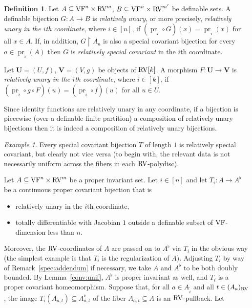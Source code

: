 \documentclass[12pt]{amsart}
\newcommand{\memph}[1]{{\color{magenta}\emph{#1}}}
\theoremstyle{plain}
\theoremstyle{definition}
\newtheorem{defn}[thm]{Definition}
\theoremstyle{remark}
\newtheorem{exam}[thm]{Example}
\numberwithin{equation}{section}
\theoremstyle{plain}
\newcommand{\VF}{\textup{VF}}
\newcommand{\RV}{\textup{RV}}
\DeclareMathOperator{\pr}{pr}
\newcommand{\0}{\emptyset}
\newcommand{\rest}{\upharpoonright}
\newcommand{\fun}{\longrightarrow}
\newcommand{\sub}{\subseteq}
\begin{document}
\begin{defn}\label{rela:unary}
Let $A \sub \VF^{n} \times \RV^{m}$, $B \sub \VF^{n} \times \RV^{m'}$ be definable sets. A definable bijection $G : A \fun B$ is \memph{relatively unary}, or more precisely, \memph{relatively unary in the $i$th coordinate}, where $i \in [n]$, if $(\pr_{\tilde{i}} \circ G)(x) = \pr_{\tilde{i}}(x)$ for all $x \in A$. If, in addition, $G \rest A_a$ is also a special covariant bijection for every $a \in \pr_{\tilde{i}} (A)$ then $G$ is \memph{relatively special covariant} in the $i$th coordinate.

Let $\bm U = (U, f)$, $\bm V = (V, g)$ be objects of $\RV[k]$. A morphism $F : \bm U \fun \bm V$ is \memph{relatively unary in the $i$th coordinate}, where $i \in [k]$, if $(\pr_{\tilde{i}} \circ g \circ F)(u) = (\pr_{\tilde{i}} \circ f)(u)$ for all $u \in U$.
\end{defn}

Since identity functions are relatively unary in any coordinate, if a  bijection  is piecewise (over a definable finite partition) a composition of relatively unary bijections then it is indeed a composition of relatively unary bijections.

\begin{exam}
Every  special covariant bijection $T$ of length $1$ is relatively special covariant, but clearly not vice versa (to begin with, the relevant data is not necessarily uniform across the fibers in each $\RV$-polydisc).
\end{exam}

Let $A \sub \VF^{n} \times \RV^{m}$ be a proper invariant set. Let $i\in[n]$ and let $T_i:A\fun A^\flat$ be a continuous proper covariant bijection that is
\begin{itemize}
  \item relatively unary in the $i$th coordinate,
  \item totally differentiable with Jacobian $1$ outside a definable subset of $\VF$-dimension less than $n$.
\end{itemize}
Moreover, the $\RV$-coordinates of $A$ are passed on to $A^\flat$ via $T_i$ in the obvious way (the simplest example is that $T_i$ is the regularization of $A$). Adjusting $T_i$ by way of Remark~\ref{spec:addendum} if necessary, we take $A$ and $A^\flat$ to be both doubly bounded. By Lemma~\ref{conv:unif}, $A^\flat$ is proper invariant as well, and $T_i$ is a proper covariant homeomorphism. Suppose that, for all $a \in A_{\tilde i}$ and all $t \in (A_{a})_{\RV}$, the image $T_i(A_{a, t}) \sub A_{a, t}^\flat$ of the fiber $A_{a, t} \sub A$ is an $\RV$-pullback.  Let
\end{document}
